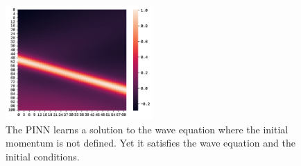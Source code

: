 \documentclass[twoside,11pt]{report}
\begin{document}
    \begin{figure}[!ht]
            \begin{center}
                \includegraphics[width=0.5\textwidth]{../runsAndFigures/wave_tf_pinn_velocity.png}
            \end{center}
            \caption
            {
                The PINN learns a solution to the wave equation where the initial momentum is not defined.
                Yet it satisfies the wave equation and the initial conditions.
            }\label{fig:wave_tf_dnn}
    \end{figure}
\end{document}
